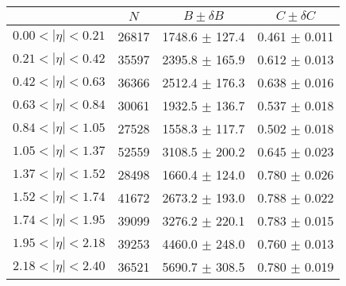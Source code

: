 \begin{tabular}{lccc}
\hline
    &   $N$   & $B \pm \delta B$  &  $C \pm \delta C$ \\
\hline
$0.00 < |\eta| <0.21$          & 26817      & 1748.6     $\pm$ 127.4 & 0.461      $\pm$ 0.011 \\
$0.21 < |\eta| <0.42$          & 35597      & 2395.8     $\pm$ 165.9 & 0.612      $\pm$ 0.013 \\
$0.42 < |\eta| <0.63$          & 36366      & 2512.4     $\pm$ 176.3 & 0.638      $\pm$ 0.016 \\
$0.63 < |\eta| <0.84$          & 30061      & 1932.5     $\pm$ 136.7 & 0.537      $\pm$ 0.018 \\
$0.84 < |\eta| <1.05$          & 27528      & 1558.3     $\pm$ 117.7 & 0.502      $\pm$ 0.018 \\
$1.05 < |\eta| <1.37$          & 52559      & 3108.5     $\pm$ 200.2 & 0.645      $\pm$ 0.023 \\
$1.37 < |\eta| <1.52$          & 28498      & 1660.4     $\pm$ 124.0 & 0.780      $\pm$ 0.026 \\
$1.52 < |\eta| <1.74$          & 41672      & 2673.2     $\pm$ 193.0 & 0.788      $\pm$ 0.022 \\
$1.74 < |\eta| <1.95$          & 39099      & 3276.2     $\pm$ 220.1 & 0.783      $\pm$ 0.015 \\
$1.95 < |\eta| <2.18$          & 39253      & 4460.0     $\pm$ 248.0 & 0.760      $\pm$ 0.013 \\
$2.18 < |\eta| <2.40$          & 36521      & 5690.7     $\pm$ 308.5 & 0.780      $\pm$ 0.019 \\
\hline
\end{tabular}
